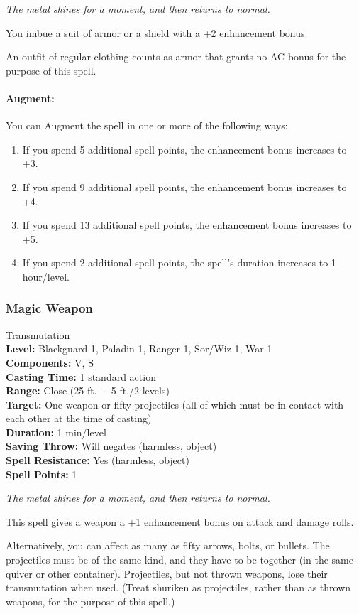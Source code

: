 \emph{The metal shines for a moment, and then returns to normal.}

You imbue a suit of armor or a shield with a +2 enhancement bonus.

An outfit of regular clothing counts as armor that grants no AC bonus for the purpose of this spell.

\paragraph{Augment:} You can Augment the spell in one or more of the following ways:
\begin{enumerate}
 \item If you spend 5 additional spell points, the enhancement bonus increases to +3.
 \item If you spend 9 additional spell points, the enhancement bonus increases to +4.
 \item If you spend 13 additional spell points, the enhancement bonus increases to +5.
 \item If you spend 2 additional spell points, the spell's duration increases to 1 hour/level.
\end{enumerate}
\subsubsection{Magic Weapon}
\label{Spell:MagicWeapon}
Transmutation
\\ \textbf{Level:} Blackguard 1, Paladin 1, Ranger 1, Sor/Wiz 1, War 1
\\ \textbf{Components:} V, S
\\ \textbf{Casting Time:} 1 standard action
\\ \textbf{Range:} Close (25 ft. + 5 ft./2 levels)
\\ \textbf{Target:} One weapon or fifty projectiles (all of which must be in contact with each other at the time of casting)
\\ \textbf{Duration:} 1 min/level
\\ \textbf{Saving Throw:} Will negates (harmless, object)
\\ \textbf{Spell Resistance:} Yes (harmless, object)
\\ \textbf{Spell Points:} 1

\emph{The metal shines for a moment, and then returns to normal.}

This spell gives a weapon a +1 enhancement bonus on attack and damage rolls.

Alternatively, you can affect as many as fifty arrows, bolts, or bullets. 
The projectiles must be of the same kind, and they have to be together (in the same quiver or other container). 
Projectiles, but not thrown weapons, lose their transmutation when used. (Treat shuriken as projectiles, rather than as thrown weapons, for the purpose of this spell.)

